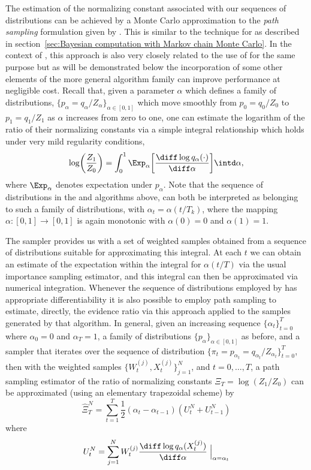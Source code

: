 The estimation of the normalizing constant associated with our sequences of
distributions can be achieved by a Monte Carlo approximation to the \emph{path
  sampling} formulation given by \cite{Gelman:1998ei}. This is similar to the
technique for \pmcmc as described in section~\ref{sec:Bayesian computation
  with Markov chain Monte Carlo}. In the context of \smc, this approach is
also very closely related to the use of \ais for the same purpose
\cite{Neal:2001we} but as will be demonstrated below the incorporation of some
other elements of the more general \smc algorithm family can improve
performance at negligible cost. Recall that, given a parameter $\alpha$ which
defines a family of distributions, $\{p_{\alpha} = q_{\alpha} /
Z_\alpha\}_{\alpha \in [0,1]}$ which move smoothly from $p_0 = q_0 / Z_0$ to
$p_1 = q_1 / Z_1$ as $\alpha$ increases from zero to one, one can estimate the
logarithm of the ratio of their normalizing constants via a simple integral
relationship which holds under very mild regularity conditions,
\begin{equation}
  \log\biggl( \frac{Z_1}{Z_0} \biggr) =
  \int_{0}^{1} \Exp_\alpha \biggl[ \rnd{\log q_{\alpha}(\cdot)}{\alpha}
  \biggr] \intd\alpha, \label{eq:path_identity}
\end{equation}
where $\Exp_\alpha$ denotes expectation under $p_\alpha$. Note that the
sequence of distributions in the \smc[2] and \smc[3] algorithms above, can both be
interpreted as belonging to such a family of distributions, with $\alpha_t =
\alpha(t/T_k)$, where the mapping $\alpha:[0,1]\to[0,1]$ is again monotonic
with $\alpha(0) = 0$ and $\alpha(1) = 1$.

The \smc sampler provides us with a set of weighted samples obtained from a
sequence of distributions suitable for approximating this integral. At each
$t$ we can obtain an estimate of the expectation within the integral for
$\alpha(t/T)$ via the usual importance sampling estimator, and this integral
can then be approximated via numerical integration. Whenever the sequence
of distributions employed by \smc[3] has appropriate differentiability it is
also possible to employ path sampling to estimate, directly, the evidence
ratio via this approach applied to the samples generated by that algorithm. In
general, given an increasing sequence $\{\alpha_t\}_{t=0}^T$ where $\alpha_0 =
0$ and $\alpha_T = 1$, a family of distributions
$\{p_{\alpha}\}_{\alpha\in[0,1]}$ as before, and a \smc sampler that iterates
over the sequence of distribution $\{\pi_t = p_{\alpha_t} =
q_{\alpha_t}/Z_{\alpha_t}\}_{t=0}^T$, then with the weighted samples
$\{W_t^{(j)},X_t^{(j)}\}_{j=1}^N$, and $t = 0,\dots,T$, a path sampling
estimator of the ratio of normalizing constants $\Xi_T = \log(Z_1/Z_0)$
can be approximated (using an elementary trapezoidal scheme) by
\begin{equation}
  \hat\Xi_{T}^{N} = \sum_{t=1}^T
  \frac{1}{2}(\alpha_t - \alpha_{t - 1})(U_t^N + U_{t-1}^N)
  \label{eq:path_est}
\end{equation}
where
\begin{equation}
  U_t^N = \sum_{j=1}^N
  W_t^{(j)} \rnd{\log q_{\alpha}(X_t^{(j)})}{\alpha}\Bigm|_{\alpha = \alpha_t}
\end{equation}

